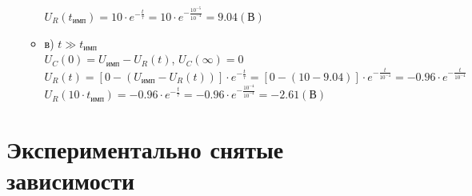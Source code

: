 \begin{itemize}
\begin{itemize}
		$U_R(t_\text{имп}) = 10 \cdot e^{-\frac{t}{\tau}} = 10 \cdot e^{-\frac{10^{-5}}{10^{-4}}} = 9.04 (\text{В})$\\
	
\item[] в) $t \gg t_\text{имп}$\\

		$U_C(0)	= U_\text{имп} - U_R(t)$, $U_C(\infty) = 0$\\
		$U_R(t) = [0 - (U_\text{имп} - U_R(t))] \cdot e^{-\frac{t}{\tau}} = [0 - (10 - 9.04)] \cdot e^{-\frac{t}{10^{-4}}} = -0.96 \cdot e^{-\frac{t}{10^{-4}}}$\\
		$U_R(10 \cdot t_\text{имп}) = -0.96 \cdot e^{-\frac{t}{\tau}} = -0.96 \cdot e^{-\frac{10^{-4}}{10^{-4}}} = -2.61 (\text{В})$\\

\end{itemize}
\end{itemize}

\section{Экспериментально снятые зависимости}

